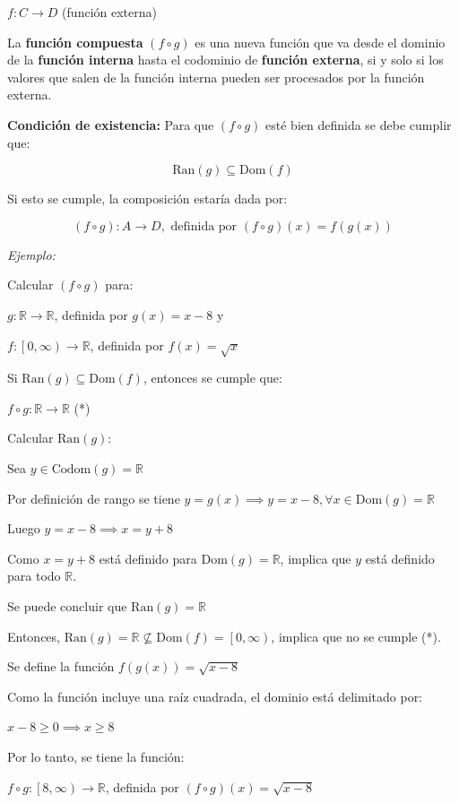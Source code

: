 \documentclass{article}
\begin{document}
$f: C \to D$ (función externa)

La \textbf{función compuesta} $(f \circ g)$ es una nueva función que va desde el dominio de la \textbf{función interna} hasta el codominio de \textbf{función externa}, si y solo si los valores que salen de la función interna pueden ser procesados por la función externa.

\textbf{Condición de existencia:} Para que $(f \circ g)$ esté bien definida se debe cumplir que:

\[ \text{Ran}(g) \subseteq \text{Dom}(f) \]

Si esto se cumple, la composición estaría dada por:

\[ (f \circ g): A \to D, \text{ definida por }(f \circ g)(x) = f(g(x)) \]

\textit{Ejemplo:}

Calcular $(f \circ g)$ para: 

$g: \mathbb{R} \to \mathbb{R}$, definida por $g(x) = x - 8$ y 

$f: \left[0, \infty \right) \to \mathbb{R}$, definida por $f(x) = \sqrt{x}$

Si $\text{Ran}(g) \subseteq \text{Dom}(f)$, entonces se cumple que:

$f \circ g: \mathbb{R} \to \mathbb{R}$ (*) 

Calcular $\text{Ran}(g):$

Sea $y \in \text{Codom}(g) = \mathbb{R}$

Por definición de rango se tiene $y = g(x) \implies y = x - 8, \forall x \in \text{Dom}(g) = \mathbb{R}$

Luego $y = x - 8 \implies x = y + 8$

Como $x = y + 8$ está definido para $\text{Dom}(g) = \mathbb{R}$, implica que $y$ está definido para todo $\mathbb{R}$.

Se puede concluir que $\text{Ran}(g) = \mathbb{R}$

Entonces, $\text{Ran}(g)= \mathbb{R} \not\subseteq \text{Dom}(f) = \left[0, \infty \right)$, implica que no se cumple (*).

Se define la función $f(g(x)) = \sqrt{x - 8}$

Como la función incluye una raíz cuadrada, el dominio está delimitado por:

$x - 8 \ge 0 \implies x \ge 8$

Por lo tanto, se tiene la función:

$f \circ g: \left[8, \infty \right) \to \mathbb{R}$, definida por $(f \circ g)(x) = \sqrt{x - 8}$
\end{document}
